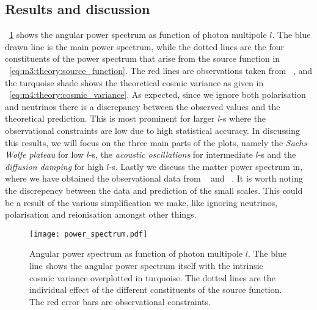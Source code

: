 \subsection{Results and discussion}\label{sec:m4:results}
    ~\cref{fig:m4:angular_power_spectrum} shows the angular power spectrum as function of photon multipole $l$. The blue drawn line is the main power spectrum, while the dotted lines are the four constituents of the power spectrum that arise from the source function in ~\cref{eq:m3:theory:source_function}. The red lines are observations taken from ~\cite{Planck2020}, and the turquoise shade shows the theoretical cosmic variance as given in ~\cref{eq:m4:theory:cosmic_variance}. As expected, since we ignore both polarisation and neutrinos there is a discrepancy between the observed values and the theoretical prediction. This is most prominent for larger $l$-s where the observational constraints are low due to high statistical accuracy. In discussing this results, we will focus on the three main parts of the plots, namely the \textit{Sachs-Wolfe plateau} for low $l$-s, the \textit{acoustic oscillations} for intermediate $l$-s and the \textit{diffusion damping} for high $l$-s. Lastly we discuss the matter power spectrum in, where we have obtained the observational data from ~\cite{Chabanier_2019} and ~\cite{Hlozek_2012}. It is worth noting the discrepency between the data and prediction of the small scales. This could be a result of the various simplification we make, like ignoring neutrinos, polarisation and reionisation amongst other things. 
    \begin{figure}
        \texttt{[image: power\_spectrum.pdf]}
        \caption{Angular power spectrum as function of photon multipole $l$. The blue line shows the angular power spectrum itself with the intrinsic cosmic variance overplotted in turquoise. The dotted lines are the individual effect of the different constituents of the source function. The red error bars are observational constraints.}
        \label{fig:m4:angular_power_spectrum}
    \end{figure}
